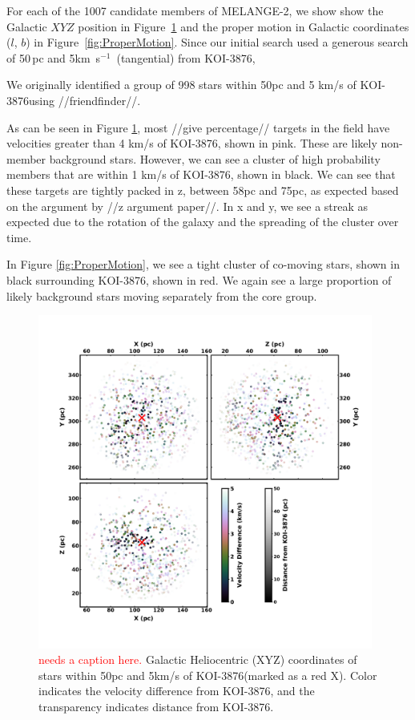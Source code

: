\documentclass[twocolumn]{aastex631}
\newcommand{\starname}{KOI-3876}
\newcommand\kms{km~s$^{-1}$}
\begin{document}
For each of the 1007 candidate members of MELANGE-2, we show show the Galactic $XYZ$ position in Figure~\ref{fig:xyz} and the proper motion in Galactic coordinates ($l$, $b$) in Figure~\ref{fig:ProperMotion}. Since our initial search used a generous search of 50\,pc and 5\kms\ (tangential) from \starname, 

We originally identified a group of 998 stars within 50pc and 5 km/s of \starname using //friendfinder//. 

As can be seen in Figure \ref{fig:xyz}, most //give percentage// targets in the field have velocities greater than 4 km/s of \starname, shown in pink. These are likely non-member background stars. However, we can see a cluster of high probability members that are within 1 km/s of \starname, shown in black. We can see that these targets are tightly packed in z, between 58pc and 75pc, as expected based on the argument by //z argument paper//. In x and y, we see a streak as expected due to the rotation of the galaxy and the spreading of the cluster over time.

In Figure \ref{fig:ProperMotion}, we see a tight cluster of co-moving stars, shown in black surrounding \starname, shown in red. We again see a large proportion of likely background stars moving separately from the core group.


\begin{figure}[tb]
    \centering
    \includegraphics[width=0.98\textwidth]{xyzSpaceFadedV2.pdf}
    \caption{\textcolor{red}{needs a caption here.} Galactic Heliocentric (XYZ) coordinates of stars within 50pc and 5km/s of \starname (marked as a red X). Color indicates the velocity difference from \starname, and the transparency indicates distance from \starname.}
    \label{fig:xyz}
\end{figure} 
    
\end{document}
